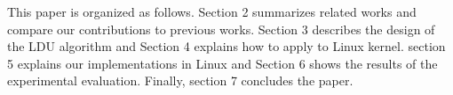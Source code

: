 %
%
This paper is organized as follows. 
Section 2 summarizes related works and compare our contributions to previous
works. 
Section 3 describes the design of the LDU algorithm and 
Section 4 explains how to apply to Linux kernel.
section 5 explains our implementations in Linux and
Section 6 shows the results of the experimental evaluation. 
Finally, section 7 concludes the paper.



%
%







